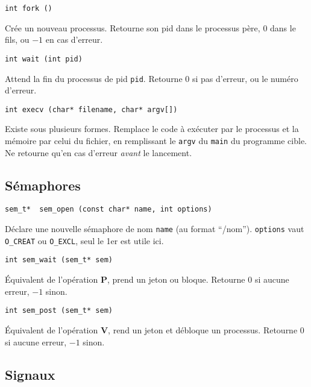 \documentclass[a4paper]{article}
\begin{document}
\begin{multicols*}{2}
    \begin{lstlisting}
int fork ()
    \end{lstlisting}

    Cr\'ee un nouveau processus.
    Retourne son pid dans le processus p\`ere, $0$ dans le fils, ou $-1$ en cas d'erreur.

    \begin{lstlisting}
int wait (int pid)
    \end{lstlisting}

    Attend la fin du processus de pid \texttt{pid}.
    Retourne 0 si pas d'erreur, ou le num\'ero d'erreur.

    \begin{lstlisting}
int execv (char* filename, char* argv[])
    \end{lstlisting}

    Existe sous plusieurs formes.
    Remplace le code à exécuter par le processus et la mémoire par celui du fichier, en remplissant le \texttt{argv} du \texttt{main} du programme cible.
    Ne retourne qu'en cas d'erreur \emph{avant} le lancement.

    \subsection{Sémaphores}

    \begin{lstlisting}
sem_t*  sem_open (const char* name, int options)
    \end{lstlisting}
    Déclare une nouvelle sémaphore de nom \texttt{name} (au format ``/nom''). 
    \texttt{options} vaut \texttt{O\_CREAT} ou \texttt{O\_EXCL}, seul le 1er est utile ici.


    \begin{lstlisting}
int sem_wait (sem_t* sem)
    \end{lstlisting}
    \'Equivalent de l'opération \textbf{P}, prend un jeton ou bloque.
    Retourne $0$ si aucune erreur, $-1$ sinon.


    \begin{lstlisting}
int sem_post (sem_t* sem)
    \end{lstlisting}
    \'Equivalent de l'opération \textbf{V}, rend un jeton et débloque un processus.
    Retourne $0$ si aucune erreur, $-1$ sinon.

    \subsection{Signaux}


\end{multicols*}
\end{document}

